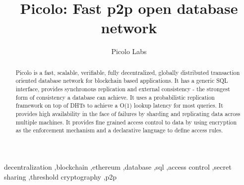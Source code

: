 \documentclass[preprint,12pt]{elsarticle}
\begin{document}
\begin{frontmatter}


\title{Picolo: Fast p2p open database network}

\author{Picolo Labs}
\address{San Francisco, California}




\begin{abstract}
Picolo is a fast, scalable, verifiable, fully decentralized, globally distributed transaction oriented database network for
blockchain based applications.  It has a generic SQL interface, provides synchronous replication and external consistency - the strongest form of consistency a database can achieve. It uses a probabilistic replication framework on top of DHTs to achieve a O(1) lookup latency for most queries. It provides high availability in the face of failures by sharding and replicating data across multiple machines. It provides fine grained access control to data by using encryption as the enforcement mechanism and a declarative language to define access rules. 
\end{abstract}

\begin{keyword}
	decentralization \sep blockchain \sep ethereum \sep database \sep sql \sep access control \sep secret sharing \sep threshold cryptography \sep p2p
\end{keyword}

\end{frontmatter}
\end{document}
